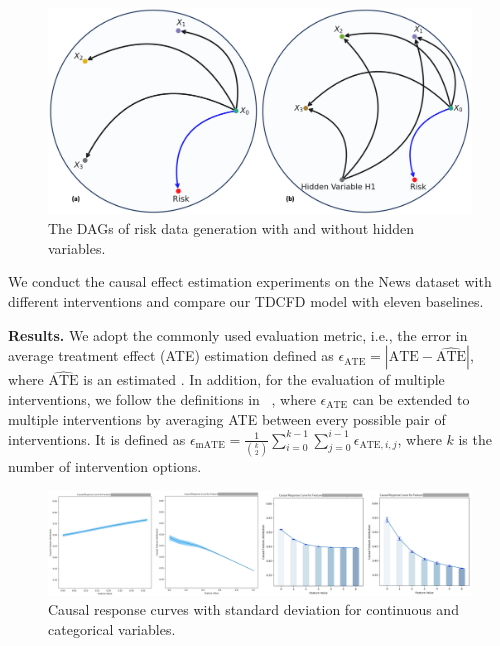 \documentclass[letterpaper]{article} %
\theoremstyle{definition}
\theoremstyle{remark}
\begin{document}
\begin{figure}
  \centering
  \includegraphics[width=0.75\linewidth]{add_hidden.jpg}
 \vspace{-2mm}
  \caption{The DAGs of risk data generation with and without hidden variables.}
 \vspace{-5mm}
  \label{fig:add hidden}
\end{figure}


We conduct the causal effect estimation experiments on the News dataset with different interventions and compare our TDCFD model with eleven baselines. 


\noindent\textbf{Results.} We adopt the commonly used evaluation metric, i.e., the error in average treatment effect (ATE) estimation defined as $\epsilon_\text{ATE}  = |\text{ATE} - \widehat{\text{ATE}}|$, where $\widehat{\text{ATE}}$ is an estimated . In addition, for the evaluation of multiple interventions, we follow the definitions in ~\cite{schwab2018perfect}, where $\epsilon_\text{ATE}$ can be extended to multiple interventions by averaging ATE between every possible pair of interventions. It is defined as $\epsilon_\text{mATE}  = \frac{1}{\binom {k}2}\sum_{i=0}^{k-1}\sum_{j=0}^{i-1}\epsilon_{\text{ATE},i,j}$, where $k$ is the number of intervention options.

\begin{figure}[t]
  \centering
  \includegraphics[width=0.95\linewidth]{causal_response_curve.jpg}
 \vspace{-3mm}
  \caption{Causal response curves with standard deviation for continuous and categorical variables.}
 \vspace{-4mm}
  \label{fig:curve}
\end{figure}
\end{document}
